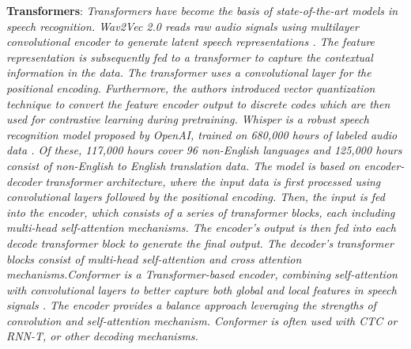 \documentclass[preprint,12pt]{elsarticle}
\begin{document}
\textbf{Transformers}: \emph{Transformers have become the basis of state-of-the-art models in speech recognition. Wav2Vec 2.0 reads raw audio signals using multilayer convolutional encoder to generate latent speech representations \citep{baevski_wav2vec_2020}. The feature representation is subsequently fed to a transformer to capture the contextual information in the data. The transformer uses a convolutional layer for the positional encoding. Furthermore, the authors introduced vector quantization technique to convert the feature encoder output to discrete codes which are then used for contrastive learning during pretraining. Whisper is a robust speech recognition model proposed by OpenAI, trained on 680,000 hours of labeled audio data \citep{radford_robust_2022}. Of these, 117,000 hours cover 96 non-English languages and 125,000 hours consist of non-English to English translation data. The model is based on encoder-decoder transformer architecture, where the input data is first processed using convolutional layers followed by the positional encoding. Then, the input is fed into the encoder, which consists of a series of transformer blocks, each including multi-head self-attention mechanisms. The encoder's output is then fed into each decode transformer block to generate the final output. The decoder's transformer blocks consist of multi-head self-attention and cross attention mechanisms.Conformer is a Transformer-based encoder, combining self-attention with convolutional layers to better capture both global and local features in speech signals \cite{gulati_conformer_2020}. The encoder provides a balance approach leveraging the strengths of convolution and self-attention mechanism. Conformer is often used with CTC or RNN-T, or other decoding mechanisms.}
\end{document}
